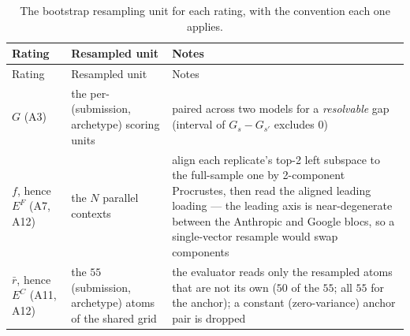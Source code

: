 \begin{longtable}[]{@{}
  >{\raggedright\arraybackslash}p{}
  >{\raggedright\arraybackslash}p{}
  >{\raggedright\arraybackslash}p{}@{}}
\caption{The bootstrap resampling unit for each rating, with the convention each one applies.}\tabularnewline
\toprule\noalign{}
\begin{minipage}[b]{\linewidth}\raggedright
Rating
\end{minipage} & \begin{minipage}[b]{\linewidth}\raggedright
Resampled unit
\end{minipage} & \begin{minipage}[b]{\linewidth}\raggedright
Notes
\end{minipage} \\
\midrule\noalign{}
\endfirsthead
\toprule\noalign{}
\begin{minipage}[b]{\linewidth}\raggedright
Rating
\end{minipage} & \begin{minipage}[b]{\linewidth}\raggedright
Resampled unit
\end{minipage} & \begin{minipage}[b]{\linewidth}\raggedright
Notes
\end{minipage} \\
\midrule\noalign{}
\endhead
\bottomrule\noalign{}
\endlastfoot
\(G\) (A3) & the per-(submission, archetype) scoring units & paired across two models for a \emph{resolvable} gap (interval of \(G_s-G_{s'}\) excludes \(0\)) \\
\(f\), hence \(E^{F}\) (A7, A12) & the \(N\) parallel contexts & align each replicate's top-2 left subspace to the full-sample one by 2-component Procrustes, then read the aligned leading loading --- the leading axis is near-degenerate between the Anthropic and Google blocs, so a single-vector resample would swap components \\
\(\bar r\), hence \(E^{C}\) (A11, A12) & the \(55\) (submission, archetype) atoms of the shared grid & the evaluator reads only the resampled atoms that are not its own (\(50\) of the \(55\); all \(55\) for the anchor); a constant (zero-variance) anchor pair is dropped \\
\end{longtable}

